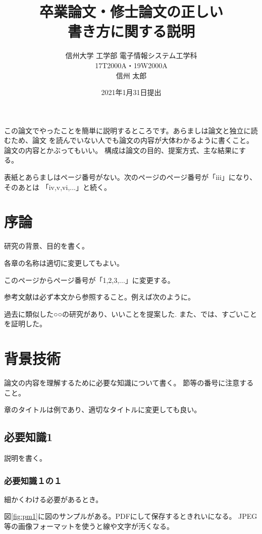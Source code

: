 \documentclass[12pt]{jreport}
\title{
\bf 卒業論文・修士論文の正しい\\
書き方に関する説明
}
\date{
2021年1月31日提出
}
\author{
信州大学 工学部 電子情報システム工学科 \\     
17T2000A・19W2000A \\
信州 太郎 \\
}
\begin{document}
\maketitle
\maegaki

\begin{jabstract}
    この論文でやったことを簡単に説明するところです。あらましは論文と独立に読むため、論文
    を読んでいない人でも論文の内容が大体わかるように書くこと。論文の内容とかぶってもいい。
    構成は論文の目的、提案方式、主な結果にする。

    表紙とあらましはページ番号がない。次のページのページ番号が「iii」になり、そのあとは
    「iv,v,vi,...」と続く。
\end{jabstract}

\maetsuke
\tableofcontents
\listoffigures
\listoftables

\hombun

\chapter{序論}
研究の背景、目的を書く。

各章の名称は適切に変更してもよい。

このページからページ番号が「1,2,3,...」に変更する。

参考文献は必ず本文から参照すること。例えば次のように。

過去に類似した○○の研究があり、いいことを提案した\cite{ref1}\cite{ref2}.
また、\cite{ref3}では、すごいことを証明した。

\chapter{背景技術}
論文の内容を理解するために必要な知識について書く。
節等の番号に注意すること。

章のタイトルは例であり、適切なタイトルに変更しても良い。

\section{必要知識1}
説明を書く。

\subsection{必要知識１の１}
細かくわける必要があるとき。

図\ref{fig:pm1}に図のサンプルがある。PDFにして保存するときれいになる。
JPEG等の画像フォーマットを使うと線や文字が汚くなる。
\end{document}
